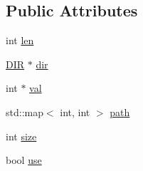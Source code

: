 \subsection*{Public Attributes}
\begin{DoxyCompactItemize}
\item 
int \hyperlink{struct_path_a3495299d7cfe9c09f4559f3bf33d58e9}{len}
\item 
\hyperlink{path_8h_a49eb6ac4643553d04b85c70646c6786d}{D\+I\+R} $\ast$ \hyperlink{struct_path_a48a4abe4c0c17bd705d650ac2e4fea98}{dir}
\item 
int $\ast$ \hyperlink{struct_path_add6f2732f31960bd9be2e6dda9f7d9ab}{val}
\item 
std\+::map$<$ int, int $>$ \hyperlink{struct_path_a3ef5985a151fd31af4b3510ed08129fc}{path}
\item 
int \hyperlink{struct_path_a3020a9bdb6f4181571b616468577627a}{size}
\item 
bool \hyperlink{struct_path_a44f7e932bded8d8eef1febd440c9516a}{use}
\end{DoxyCompactItemize}


